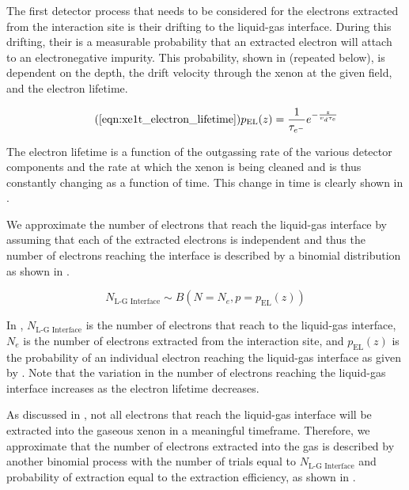 The first detector process that needs to be considered for the electrons extracted from the interaction site is their drifting to the liquid-gas interface.  During this drifting, their is a measurable probability that an extracted electron will attach to an electronegative impurity.  This probability, shown in  (repeated below), is dependent on the depth, the drift velocity through the xenon at the given field, and the electron lifetime.   

\begin{equation}
        \tag{\ref{eqn:xe1t_electron_lifetime}}
        p_{\textrm{EL}}(z) = \frac{1}{\tau_{e^-}} e^{-\frac{z}{v_d \tau_{e}}}
\end{equation} 


The electron lifetime is a function of the outgassing rate of the various detector components and the rate at which the xenon is being cleaned and is thus constantly changing as a function of time.  This change in time is clearly shown in .

We approximate the number of electrons that reach the liquid-gas interface by assuming that each of the extracted electrons is independent and thus the number of electrons reaching the interface is described by a binomial distribution as shown in .


\begin{equation}
        \label{eqn:xe1t_binomial_el}
        N_{\textrm{L-G Interface}} \sim B \left( N=N_e, p=p_{\textrm{EL}}(z) \right)
\end{equation}


In , $N_{\textrm{L-G Interface}}$ is the number of electrons that reach to the liquid-gas interface, $N_e$ is the number of electrons extracted from the interaction site, and $p_{\textrm{EL}}(z)$ is the probability of an individual electron reaching the liquid-gas interface as given by .  Note that the variation in the number of electrons reaching the liquid-gas interface increases as the electron lifetime decreases.

As discussed in , not all electrons that reach the liquid-gas interface will be extracted into the gaseous xenon in a meaningful timeframe.  Therefore, we approximate that the number of electrons extracted into the gas is described by another binomial process with the number of trials equal to $N_{\textrm{L-G Interface}}$ and probability of extraction equal to the extraction efficiency, as shown in .

